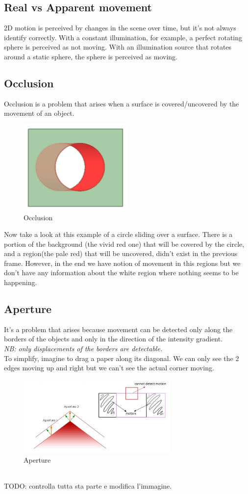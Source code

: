 \subsection{Real vs Apparent movement}
2D motion is perceived by changes in the scene over time, but it's not always identify correctly. With a constant illumination, for example, a perfect rotating sphere is perceived as not moving. With an illumination source that rotates around a static sphere, the sphere is perceived as moving.
\subsection{Occlusion}
Occlusion is a problem that arises when a surface is covered/uncovered by the movement of an object.
\begin{figure}[h]
    \centering
    \includegraphics[width=0.5\textwidth]{Figures/Occlusion.png}
    \caption{Occlusion} 
\end{figure}
Now take a look at this example of a circle sliding over a surface. There is a portion of the background (the vivid red one) that will be covered by the circle, and a region(the pale red) that will be uncovered, didn't exist in the previous frame. However, in the end we have notion of movement in this regions but we don't have any information about the white region where nothing seems to be happening. 
\subsection{Aperture}
It's a problem that arises because movement can be detected only along the borders of the objects and only in the direction of the intensity gradient. 
\\\textit{NB: only displacements of the borders are detectable.}
\\To simplify, imagine to drag a paper along its diagonal. We can only see the 2 edges moving up and right but we can't see the actual corner moving.
\begin{figure}[h]
    \centering
    \includegraphics[width=0.7\textwidth]{Figures/Aperture.jpg}
    \caption{Aperture}
\end{figure}
\\TODO: controlla tutta sta parte e modifica l'immagine.
